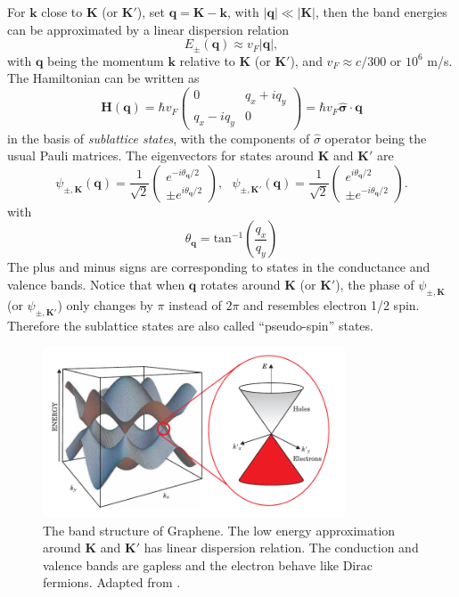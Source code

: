 \documentclass[pdflatex, sectionletters, 12pt]{pittetd}    %
\begin{document}
For $\mathbf{k}$ close to $\mathbf{K}$ (or $\mathbf{K'}$), set $\mathbf{q} = \mathbf{K} - \mathbf{k}$, with $|\mathbf{q}| \ll |\mathbf{K}|$, then the band energies can be approximated by a linear dispersion relation
$$E_{\pm}(\mathbf{q}) \approx v_F|\mathbf{q}|,$$
with $\mathbf{q}$ being the momentum $\mathbf{k}$ relative to $\mathbf{K}$ (or $\mathbf{K'}$), and $v_F \approx c/300$ or $10^6$ m/s. The Hamiltonian can be written as 
\begin{equation}
\mathbf{H}(\mathbf{q}) = 
\hbar v_F 
\begin{pmatrix}
0 & q_x + iq_y \\
q_x - iq_y & 0
\end{pmatrix}
=
\hbar v_F \hat{\mathbf{\sigma}} \cdot \mathbf{q}
\label{EQN:DiracHamiltonian}
\end{equation}
in the basis of \emph{sublattice states}, with the components of $\hat{\sigma}$ operator being the usual Pauli matrices. The eigenvectors for states around $\mathbf{K}$ and $\mathbf{K'}$ are
\begin{equation}
\psi_{\pm, \mathbf{K}}(\mathbf{q}) = \frac{1}{\sqrt{2}} 
\begin{pmatrix}
e^{-i\theta_{\mathbf{q}}/2} \\
\pm e^{i\theta_{\mathbf{q}}/2}
\end{pmatrix}, \ \ \
\psi_{\pm, \mathbf{K'}}(\mathbf{q}) = \frac{1}{\sqrt{2}} 
\begin{pmatrix}
e^{i\theta_{\mathbf{q}}/2} \\
\pm e^{-i\theta_{\mathbf{q}}/2}
\end{pmatrix}.
\label{EQN:Eigenstates}
\end{equation}
with 
$$\theta_\mathbf{q} = \mathrm{tan}^{-1}\left(\frac{q_x}{q_y}\right)$$
The plus and minus signs are corresponding to states in the conductance and valence bands. Notice that when $\mathbf{q}$ rotates around $\mathbf{K}$ (or $\mathbf{K'}$), the phase of $\psi_{\pm, \mathbf{K}}$ (or $\psi_{\pm, \mathbf{K'}}$) only changes by $\pi$ instead of $2\pi$ and resembles electron 1/2 spin. Therefore the sublattice states are also called ``pseudo-spin'' states\cite{neto2009electronic}. 

\begin{figure}[h!]
	\centering
	\includegraphics[width=0.8\textwidth]{Drawing/GrapheneBand.pdf}
	\caption{The band structure of Graphene. The low energy approximation around $\mathbf{K}$ and $\mathbf{K'}$ has linear dispersion relation. The conduction and valence bands are gapless and the electron behave like Dirac fermions. Adapted from \cite{wilson2006electrons}.}
	\label{FIG:GrapheneBand}
\end{figure}
\end{document}
